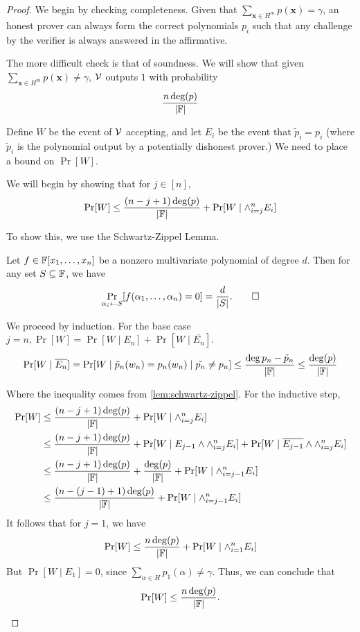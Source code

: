 \begin{proof}
	We begin by checking completeness. Given that $\sum_{\mathbf{x}\in H^m}p(\mathbf{x})=\gamma$, an honest prover can always form the correct polynomials $p_i$ such that any challenge by the verifier is always answered in the affirmative. 
	
	The more difficult check is that of soundness. We will show that given $\sum_{\mathbf{x}\in H^m}p(\mathbf{x})\neq\gamma$, $\mathcal{V}$ outputs $1$ with probability
	$$\frac{n\deg(p)}{|\mathbb{F}|}$$
	
	Define $W$ be the event of $\mathcal{V}$ accepting, and let $E_i$ be the event that $\tilde{p}_i=p_i$ (where $\tilde{p}_i$ is the polynomial output by a potentially dishonest prover.) We need to place a bound on $\Pr[W]$.
	
	We will begin by showing that for $j\in[n]$,
	$$\Pr[W]\leq\frac{(n-j+1)\deg(p)}{|\mathbb{F}|}+\Pr[W\mid\wedge_{i=j}^n E_i]$$
	
	To show this, we use the Schwartz-Zippel Lemma.
	
	\begin{lemma}
		\label{lem:schwartz-zippel}
		Let $f\in\mathbb{F}[x_1,\dots,x_n]$ be a nonzero multivariate polynomial of degree $d$. Then for any set $S\subseteq\mathbb{F}$, we have
		$$\Pr_{\alpha_i\leftarrow S}[f(\alpha_1,\dots, \alpha_n) = 0]=\frac{d}{|S|}.\qed$$
	\end{lemma}
	
	We proceed by induction. For the base case $j=n, \Pr[W]=\Pr[W\mid E_n]+\Pr[W\mid\overline{E_n}]$.
	$$\Pr[W\mid\overline{E_n}]=\Pr[W\mid\tilde{p}_n(w_n)=p_n(w_n)\mid\tilde{p_n}\neq p_n]\leq\frac{\deg{p_n-\tilde{p}_n}}{|\mathbb{F}|}\leq\frac{\deg(p)}{|\mathbb{F}|}$$
	
	Where the inequality comes from \ref{lem:schwartz-zippel}. For the inductive step,
	\begin{align*}
		\Pr[W]&\leq\frac{(n-j+1)\deg(p)}{|\mathbb{F}|}+\Pr[W\mid\wedge_{i=j}^n E_i]\\
		&\leq\frac{(n-j+1)\deg(p)}{|\mathbb{F}|}+\Pr[W\mid E_{j-1}\wedge\wedge_{i=j}^n E_i]+\Pr[W\mid\overline{E_{j-1}}\wedge\wedge_{i=j}^n E_i]\\
		&\leq\frac{(n-j+1)\deg(p)}{|\mathbb{F}|}+\frac{\deg(p)}{|\mathbb{F}|}+\Pr[W\mid\wedge_{i=j-1}^n E_i]\\
		&\leq\frac{(n-(j-1)+1)\deg(p)}{|\mathbb{F}|}+\Pr[W\mid\wedge_{i=j-1}^n E_i]
	\end{align*}
	It follows that for $j=1$, we have
	$$\Pr[W]\leq\frac{n\deg(p)}{|\mathbb{F}|}+\Pr[W\mid\wedge_{i=1}^nE_i]$$
	But $\Pr[W\mid E_1]=0$, since $\sum_{\alpha\in H}p_1(\alpha)\neq\gamma$. Thus, we can conclude that
	$$\Pr[W]\leq\frac{n\deg(p)}{|\mathbb{F}|}.$$
\end{proof}

